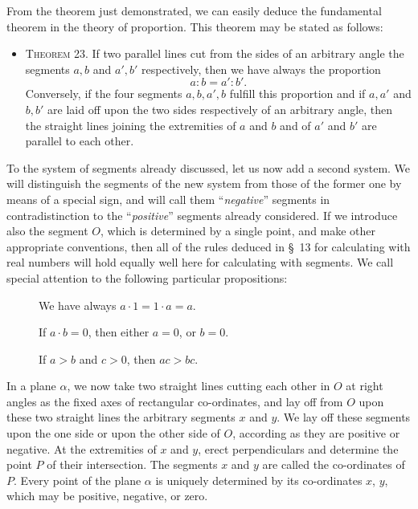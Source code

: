 \documentclass[11pt,oneside]{book}
\begin{document}
From the theorem just demonstrated, we can easily
deduce the fundamental theorem in the theory of
proportion. This theorem may be stated as follows:

\begin{itemize}
\item[]{\scshape Theorem 23.} If two parallel lines cut from the
sides of an arbitrary angle the segments $a,b$
and $a',b'$ respectively, then we have always the
proportion
\[
  a: b = a': b'.
\]
Conversely, if the four segments $a,b,a',b$
fulfill this proportion and if $a,a'$ and $b,b'$ are
laid off upon the two sides respectively of an
arbitrary angle, then the straight lines joining
the extremities of $a$ and $b$ and of $a'$ and $b'$ are
parallel to each other.
\end{itemize}
\label{folio53}
\bigskip
{}\label{p17}
\bigskip

To the system of segments already discussed, let
us now add a second system. We will distinguish the
segments of the new system from those of the former
one by means of a special sign, and will call them
``\emph{negative}'' segments in contradistinction to the ``\emph{positive}''
segments already considered. If we introduce
also the segment $O$, which is determined by a single
point, and make other appropriate conventions, then
all of the rules deduced in \S~13 for calculating with
real numbers will hold equally well here for
calculating with segments. We call special attention to
the following particular propositions:

\begin{description}
\item[] We have always $a\cdot 1 = 1\cdot a=a$.
\item[] If $a\cdot b=0$, then either $a=0$, or $b=0$.
\item[] If $a>b$ and $c>0$, then $ac>bc$.
\end{description}

In a plane $\alpha$, we now take two straight lines cutting
each other in $O$ at right angles as the fixed axes
of rectangular co-ordinates, and lay off from $O$ upon
these two straight lines the arbitrary segments $x$ and
$y$. We lay off these segments upon the one side or
upon the other side of $O$, according as they are
positive or negative. At the extremities of $x$ and $y$, erect
perpendiculars and determine the point $P$ of their
intersection. The segments $x$ and $y$ are called the
co-ordinates of $P$. Every point of the plane $\alpha$ is uniquely
determined by its co-ordinates $x$, $y$, which may be
positive, negative, or zero.
\end{document}
